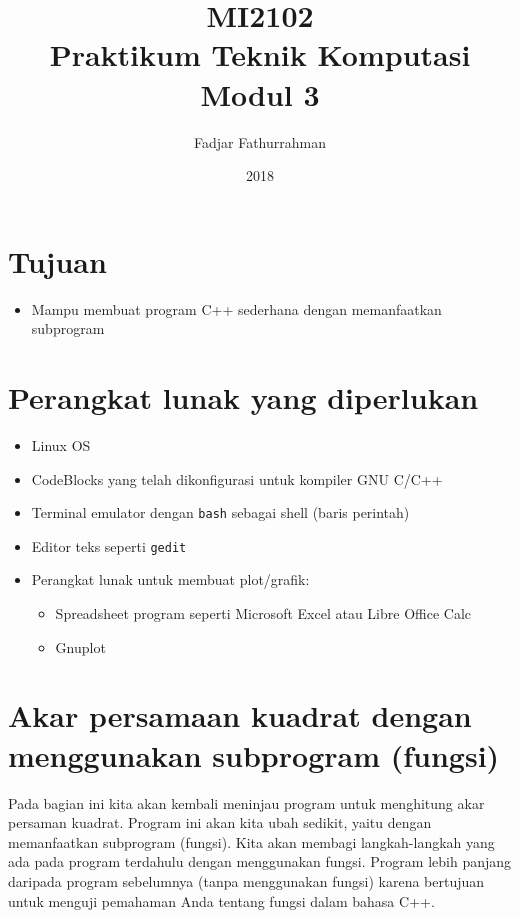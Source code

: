 \documentclass[a4paper,11pt]{extarticle}
\title{
MI2102\\
Praktikum Teknik Komputasi\\
Modul 3}
\author{Fadjar Fathurrahman}
\date{2018}
\begin{document}
\maketitle

\section{Tujuan}
\begin{itemize}
\item Mampu membuat program C++ sederhana dengan memanfaatkan subprogram
\end{itemize}

\section{Perangkat lunak yang diperlukan}
\begin{itemize}
\item Linux OS
\item CodeBlocks yang telah dikonfigurasi untuk kompiler GNU C/C++
\item Terminal emulator dengan \texttt{bash} sebagai shell (baris perintah)
\item Editor teks seperti \texttt{gedit}
\item Perangkat lunak untuk membuat plot/grafik:
\begin{itemize}
\item Spreadsheet program seperti \textsf{Microsoft Excel} atau \textsf{Libre Office Calc}
\item \textsf{Gnuplot}
\end{itemize}
\end{itemize}

\section{Akar persamaan kuadrat dengan menggunakan subprogram (fungsi)}
Pada bagian ini kita akan kembali meninjau program untuk menghitung akar
persaman kuadrat. Program ini akan kita ubah sedikit, yaitu dengan memanfaatkan
subprogram (fungsi). Kita akan membagi langkah-langkah yang ada pada
program terdahulu dengan menggunakan fungsi.
Program lebih panjang daripada program sebelumnya (tanpa menggunakan fungsi)
karena bertujuan untuk menguji pemahaman Anda tentang fungsi dalam bahasa C++.
\end{document}
